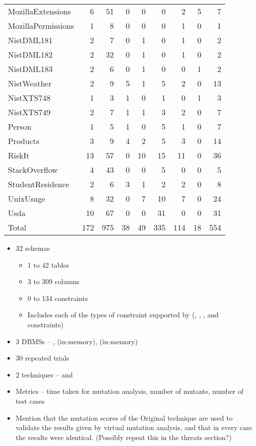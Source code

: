 \begin{table}[t!]
{\begin{tabular}{l@{\hskip -5pt}rrrrrrrr}
					MozillaExtensions & 6 & 51 & 0 & 0 & 0 & 2 & 5 & 7 \\
					MozillaPermissions & 1 & 8 & 0 & 0 & 0 & 1 & 0 & 1 \\
					NistDML181 & 2 & 7 & 0 & 1 & 0 & 1 & 0 & 2 \\
					NistDML182 & 2 & 32 & 0 & 1 & 0 & 1 & 0 & 2 \\
					NistDML183 & 2 & 6 & 0 & 1 & 0 & 0 & 1 & 2 \\
					NistWeather & 2 & 9 & 5 & 1 & 5 & 2 & 0 & 13 \\
					NistXTS748 & 1 & 3 & 1 & 0 & 1 & 0 & 1 & 3 \\
					NistXTS749 & 2 & 7 & 1 & 1 & 3 & 2 & 0 & 7 \\
					Person & 1 & 5 & 1 & 0 & 5 & 1 & 0 & 7 \\
					Products & 3 & 9 & 4 & 2 & 5 & 3 & 0 & 14 \\
					RiskIt & 13 & 57 & 0 & 10 & 15 & 11 & 0 & 36 \\
					StackOverflow & 4 & 43 & 0 & 0 & 5 & 0 & 0 & 5 \\
					StudentResidence & 2 & 6 & 3 & 1 & 2 & 2 & 0 & 8 \\
					UnixUsage & 8 & 32 & 0 & 7 & 10 & 7 & 0 & 24 \\
					Usda & 10 & 67 & 0 & 0 & 31 & 0 & 0 & 31 \\
					\hline
					{Total} & 172 & 975 & 38 & 49 & 335 & 114 & 18 & 554 \\
					\hline

				\end{tabular}
			}
		\end{table}

		\begin{itemize}
			\item 32 schemas
			\begin{itemize}
				\item 1 to 42 tables
				\item 3 to 309 columns
				\item 0 to 134 constraints
				\item Includes each of the types of constraint supported by \SchemaAnalyst (\PK, \FK, \NOTNULL, \UNIQUE and \CHECK constraints)
			\end{itemize}
			\item 3 DBMSs -- \Postgres, \HyperSQL (in-memory), \SQLite (in-memory)
			\item 30 repeated trials
			\item 2 techniques -- \Original and \VirtualMutationAnalysis
			\item Metrics -- time taken for mutation analysis, number of mutants, number of test cases
			\item Mention that the mutation scores of the Original technique are used to validate the results given by virtual mutation analysis, and that in every case the results were identical. (Possibly repeat this in the threats section?)
		\end{itemize}

